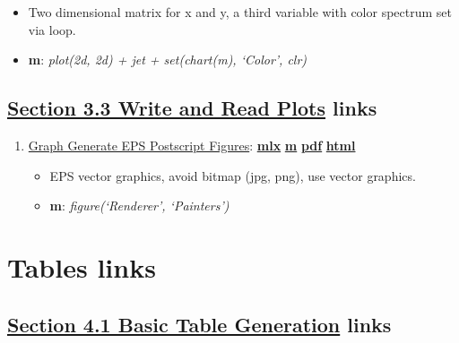 \documentclass[
]{book}
\providecommand{\tightlist}{%
  \setlength{\itemsep}{0pt}\setlength{\parskip}{0pt}}
\begin{document}
\begin{enumerate}
  \begin{itemize}
  \tightlist
  \item
    Two dimensional matrix for x and y, a third variable with color spectrum set via loop.
  \item
    \textbf{m}: \emph{plot(2d, 2d) + jet + set(chart(m), `Color', clr)}
  \end{itemize}
\end{enumerate}

\hypertarget{section-3.3-write-and-read-plotswrite-and-read-plots-links}{%
\subsection{\texorpdfstring{\protect\hyperlink{write-and-read-plots}{Section 3.3 Write and Read Plots} links}{Section 3.3 Write and Read Plots links}}\label{section-3.3-write-and-read-plotswrite-and-read-plots-links}}

\begin{enumerate}
\def\labelenumi{\arabic{enumi}.}
\tightlist
\item
  \href{https://fanwangecon.github.io/M4Econ/graph/export/htmlpdfm/fs_eps.html}{Graph Generate EPS Postscript Figures}: \href{https://github.com/FanWangEcon/M4Econ/blob/master/graph/export/fs_eps.mlx}{\textbf{mlx}} \textbar{} \href{https://github.com/FanWangEcon/M4Econ/blob/master/graph/export/htmlpdfm/fs_eps.m}{\textbf{m}} \textbar{} \href{https://github.com/FanWangEcon/M4Econ/blob/master/graph/export/htmlpdfm/fs_eps.pdf}{\textbf{pdf}} \textbar{} \href{https://fanwangecon.github.io/M4Econ/graph/export/htmlpdfm/fs_eps.html}{\textbf{html}}

  \begin{itemize}
  \tightlist
  \item
    EPS vector graphics, avoid bitmap (jpg, png), use vector graphics.
  \item
    \textbf{m}: \emph{figure(`Renderer', `Painters')}
  \end{itemize}
\end{enumerate}

\hypertarget{tables-links}{%
\section{Tables links}\label{tables-links}}

\hypertarget{section-4.1-basic-table-generationbasic-table-generation-links}{%
\subsection{\texorpdfstring{\protect\hyperlink{basic-table-generation}{Section 4.1 Basic Table Generation} links}{Section 4.1 Basic Table Generation links}}\label{section-4.1-basic-table-generationbasic-table-generation-links}}
\end{document}
